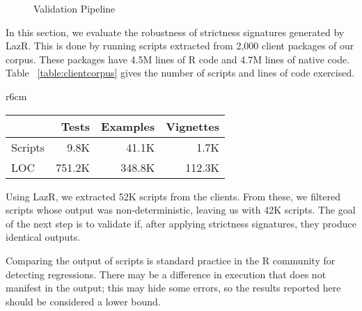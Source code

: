 \documentclass[review,creen,acmsmall]{acmart}
\newcommand{\lazr}{{\sf LazR}\xspace}
\begin{document}
\begin{figure}[th!]
{
  }
  \caption{Validation Pipeline}\label{fig:validationPipeline}
\end{figure}

In this section, we evaluate the robustness of strictness signatures generated
by \lazr. This is done by running scripts extracted from 2,000 client packages of
our corpus. These packages have 4.5M lines of R code and 4.7M lines of native
code. Table ~\ref{table:clientcorpus} gives the number of scripts and lines of code
exercised.

\begin{wraptable}{r}{6cm}  \vspace{-3mm}  \small  \centering
  \caption{Client Corpus}\label{table:clientcorpus}  \vspace{-3mm}
  \begin{tabular}{lrrr}    \toprule
    &\bf Tests&\bf Examples&\bf Vignettes\\
    \midrule
    {Scripts} &9.8K&41.1K&1.7K\\
    \midrule
    {LOC} &751.2K&348.8K&112.3K\\    \bottomrule
  \end{tabular}
\end{wraptable}%

Using \lazr, we extracted 52K scripts from the clients. From these, we filtered
scripts whose output was non-deterministic, leaving us with 42K scripts. The
goal of the next step is to validate if, after applying strictness signatures,
they produce identical outputs.

Comparing the output of scripts is standard practice in the R community for
detecting regressions. There may be a difference in execution that does not
manifest in the output; this may hide some errors, so the results reported here
should be considered a lower bound.
\end{document}
